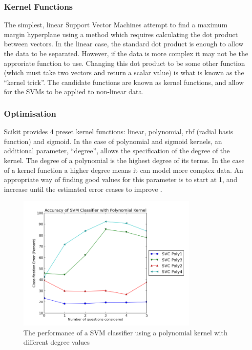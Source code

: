 \subsubsection{Kernel Functions}
\label{kernel_trick}
The simplest, linear Support Vector Machines attempt to find a maximum margin hyperplane using a method which requires calculating the dot product between vectors. In the linear case, the standard dot product is enough to allow the data to be separated. However, if the data is more complex it may not be the approriate function to use. Changing this dot product to be some other function (which must take two vectors and return a scalar value) is what is known as the ``kernel trick''. The candidate functions are known as kernel functions, and allow for the SVMs to be applied to non-linear data. 

\subsubsection{Optimisation}
Scikit provides 4 preset kernel functions: linear, polynomial, rbf (radial basis function) and sigmoid. In the case of polynomial and sigmoid kernels, an additional parameter, ``degree'', allows the specification of the degree of the kernel. The degree of a polynomial is the highest degree of its terms. In the case of a kernel function a higher degree means it can model more complex data. An appropriate way of finding good values for this parameter is to start at 1, and increase until the estimated error ceases to improve \cite{witten2011data}. 

\begin{figure}[h!]
\centering
\includegraphics[width=0.8\textwidth]{images/svcpoly.png}
\caption{The performance of a SVM classifier using a polynomial kernel with different degree values}
\label{fig:svcpoly}
\end{figure}

